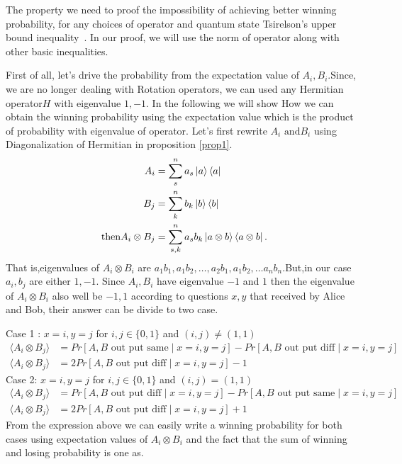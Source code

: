 The property we need to proof the impossibility of achieving better  winning probability, for any choices of operator and quantum state Tsirelson’s  upper bound inequality~\citep{Cirel'son1980}.
In our proof, we will use the norm of operator along with other basic inequalities.

First of all, let's drive the probability from the expectation value of $A_i,B_i$.Since, we are no longer dealing with Rotation operators, we can used any Hermitian  operator$H$ with eigenvalue $1,-1$. In the following we will show How we can obtain the winning probability using the expectation value which is the product  of probability with  eigenvalue of operator.
Let's first rewrite $A_i\text{ and} B_i$ using  Diagonalization of Hermitian in proposition \ref{prop1}.
\begin{align}\label{NEED}
A_i&=\sum_s^n a_s \ket{a}\bra{a}\nonumber\\
B_j&=\sum_k^n  b_k \ket{b}\bra{b}\nonumber\\
\text{then} A_i\otimes B_j&=\sum_{s,k}^n  a_s b_k \ket{a\otimes b}\bra{a \otimes b}.
\end{align}
That is,eigenvalues of $A_i\otimes B_i$ are $a_1 b_1 ,a_1b_2,\dots,a_2 b_1,a_1 b_2,\ldots a_n b_n$.But,in our case $a_i,b_j$ are either $1,-1$. Since $A_i, B_i$  have eigenvalue $-1$ and $1$ then the eigenvalue of $A_i\otimes B_i$ also well be $-1,1$ according to  questions $x,y$  that received by Alice and Bob, their answer can be divide to two case.

Case 1 :
$x=i,y=j$ for $i,j\in \{0,1\}$ and $(i,j)\neq (1,1)$
\begin{align}
\langle A_i\otimes B_j \rangle&=Pr[A,B \text{ out put same} \mid  x=i,y=j]-Pr[A,B \text{ out put diff}  \mid  x=i,y=j]\\
\langle A_i\otimes B_j\rangle &=2Pr[A,B \text{ out put diff} \mid  x=i,y=j]-1
\end{align}
Case 2:
$x=i,y=j$ for $i,j\in \{0,1\}$ and $(i,j)= (1,1)$
\begin{align}
\langle A_i\otimes B_j\rangle &=Pr[A,B \text{ out put diff} \mid  x=i,y=j]-Pr[A,B \text{ out put same}  \mid  x=i,y=j]\\
\langle A_i\otimes B_j\rangle&=2Pr[A,B \text{ out put diff} \mid  x=i,y=j]+1
\end{align}
From the expression above we can easily write a winning probability for both cases using expectation values of $A_i\otimes B_i$ and the fact that the sum of winning and losing probability  is one as.

